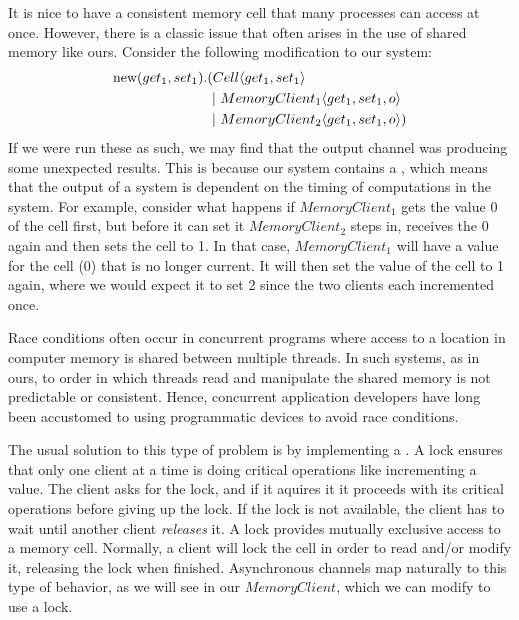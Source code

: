 It is nice to have a consistent memory cell that many processes can access at once.
However, there is a classic issue that often arises in the use of shared memory like ours.
Consider the following modification to our system:
\begin{equation}\begin{split}
	\text{new}({get_1,set_1}).&(Cell\langle get_1, set_1\rangle\\
	 &\ |\   MemoryClient_1\langle get_1,set_1,o\rangle \\
	 &\ |\   MemoryClient_2\langle get_1,set_1,o\rangle)\\
\end{split}\end{equation}
If we were run these as such, we may find that the output channel was producing some unexpected results.  
This is because our system contains a , which means that the output of a system is dependent on the timing of computations in the system.
For example, consider what happens if $MemoryClient_1$ gets the value 0 of the cell first, but before it can set it $MemoryClient_2$ steps in, receives the 0 again and then sets the cell to 1.  
In that case, $MemoryClient_1$ will have a value for the cell (0) that is no longer current.  
It will then set the value of the cell to 1 again, where we would expect it to set 2 since the two clients each incremented once.

Race conditions often occur in concurrent programs where access to a location in computer memory is shared between multiple threads.  In such systems, as in ours, to order in which threads read and manipulate the shared memory is not predictable or consistent.  Hence, concurrent application developers have long been accustomed to using programmatic devices to avoid race conditions.

The usual solution to this type of problem is by implementing a .  
A lock ensures that only one client at a time is doing critical operations like incrementing a value.  
The client asks for the lock, and if it aquires it it proceeds with its critical operations before giving up the lock.  
If the lock is not available, the client has to wait until another client \emph{releases} it.
A lock provides mutually exclusive access to a memory cell.
Normally, a client will lock the cell in order to read and/or modify it, releasing the lock when finished.
Asynchronous channels map naturally to this type of behavior, as we will see in our $MemoryClient$, which we can modify to use a lock.  

